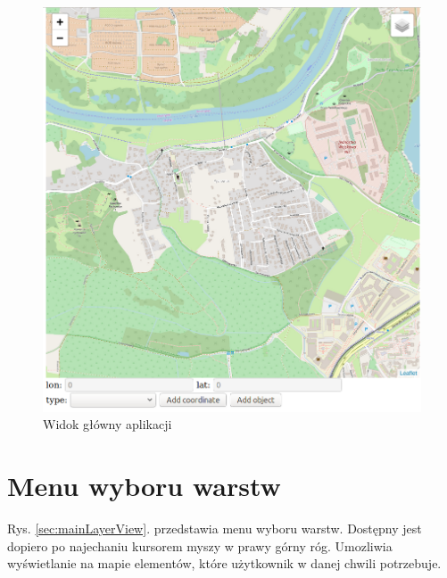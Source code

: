 \newpage
\begin{figure}[h]
\caption{Widok główny aplikacji}
\label{mainView}
\centering
\includegraphics[width=1.02\textwidth]{mainScreen}
\end{figure}

\newpage

\section{Menu wyboru warstw}
\label{sec:layerMenu}

Rys. \ref{sec:mainLayerView}. przedstawia menu wyboru warstw. Dostępny jest dopiero po najechaniu kursorem myszy w prawy górny róg. Umozliwia wyświetlanie na mapie elementów, które użytkownik w danej chwili potrzebuje. 

